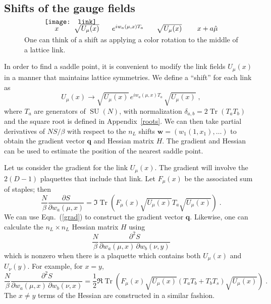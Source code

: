 \documentclass[preprint,aps,prd]{revtex4-2}
\newcommand{\be}{\begin{equation}}
\newcommand{\eq}{\end{equation}}
\DeclareMathOperator{\SU}{SU}
\DeclareMathOperator{\Tr}{Tr}
\begin{document}
\subsection{Shifts of the gauge fields}

\begin{figure}
  \[
  \begin{array}{l}
    \mbox{} \hspace{0.2in} x \hspace{0.3in} \sqrt{U_\mu(x)}
    \hspace{0.25in} e^{i w_{a}(\mu, x) T_a}
    \hspace{0.25in} \sqrt{U_\mu(x)} \hspace{0.3in} x+a\hat{\mu} \\[-0.3in]
  \texttt{[image: link]}
  \end{array}
  \]
  \caption{One can think of a shift as applying a color rotation
    to the middle of a lattice link. \label{shift}}
\end{figure}

In order to find a saddle point, it is convenient to modify
the link fields $U_\mu(x)$ in a manner that maintains lattice symmetries.
We define a ``shift'' for each link as
\be
  U_\mu(x) \to \sqrt{U_\mu(x)}\, e^{i w_{a}(\mu, x) T_a}\, \sqrt{U_\mu(x)} \; ,
    \label{shifts}
\eq
where $T_a$ are generators of $\SU(N)$, with normalization
$\delta_{a,b} = 2 \Tr(T_a T_b)$ and the square root is defined
in Appendix~\ref{roots}.
We can then take partial derivatives of $N S/\beta$ with
respect to the $n_L$ shifts $\mathbf{w} = \left(w_1(1, x_1), \ldots\right)$
to obtain the gradient vector $\mathbf{q}$ and Hessian matrix
$H$.  The gradient and Hessian can be used to estimate the
position of the nearest saddle point.

Let us consider the gradient for the link $U_\mu(x)$.
The gradient will involve the $2 (D-1)$ plaquettes that include that link.
Let $F_\mu(x)$ be the associated sum of staples; then
\be
   \frac{N}{\beta} \frac{\partial S}{\partial w_a(\mu, x)} =
   \Im\Tr\left(F_\mu(x) \sqrt{U_\mu(x)} T_a \sqrt{U_\mu(x)}\right) \; .
   \label{grad}
\eq
We can use Eqn.~(\ref{grad}) to construct the gradient vector $\mathbf{q}$.
Likewise, one can calculate the $n_L\times n_L$ Hessian matrix
$H$ using
\be
      \frac{N}{\beta} \frac{\partial^2 S}{\partial w_a(\mu, x)\, \partial w_b(\nu, y)}
\eq
which is nonzero when there is a plaquette which contains both
$U_\mu(x)$ and $U_\nu(y)$.  For example, for $x=y$,
\be
      \frac{N}{\beta} \frac{\partial^2 S}{\partial w_a(\mu, x)\, \partial w_b(\nu, x)} = \frac{1}{2}
   \Re\Tr\left(F_\mu(x) \sqrt{U_\mu(x)} \left(T_a T_b + T_b T_s\right) \sqrt{U_\mu(x)}\right) \; .
   \label{diaghess}
\eq
The $x \neq y$ terms of the Hessian are constructed in a similar fashion.
\end{document}
